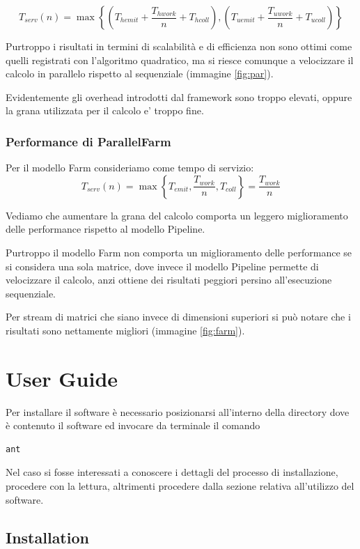 \documentclass[a4paper,10pt]{article}
\begin{document}
$$T_{serv}(n) = \max \left\lbrace \left( T_{hemit} + \frac{T_{hwork}}{n} + T_{hcoll}\right),\left( T_{uemit} + \frac{T_{uwork}}{n} + T_{ucoll}\right) \right\rbrace$$

Purtroppo i risultati in termini di scalabilit\`a e di efficienza non sono ottimi come quelli registrati con l'algoritmo quadratico, ma si riesce comunque a velocizzare il calcolo in parallelo rispetto al sequenziale (immagine \ref{fig:par}).

Evidentemente gli overhead introdotti dal framework sono troppo elevati, oppure la grana utilizzata per il calcolo e' troppo fine.


\subsubsection{Performance di \textsf{ParallelFarm}}

Per il modello \textsf{Farm} consideriamo come tempo di servizio: $$T_{serv}(n) = \max \left\lbrace T_{emit}, \frac{T_{work}}{n}, T_{coll} \right\rbrace = \frac{T_{work}}{n}$$

Vediamo che aumentare la grana del calcolo comporta un leggero miglioramento delle performance rispetto al modello \textsf{Pipeline}.

Purtroppo il modello \textsf{Farm} non comporta un miglioramento delle performance se si considera una sola matrice, dove invece il modello \textsf{Pipeline} permette di velocizzare il calcolo, anzi ottiene dei risultati peggiori persino all'esecuzione sequenziale.

Per stream di matrici che siano invece di dimensioni superiori si pu\`o notare che i risultati sono nettamente migliori (immagine \ref{fig:farm}).

\section{User Guide}
\label{sec:userguide}

Per installare il software \`e necessario posizionarsi all'interno della directory dove \`e contenuto il software ed invocare da terminale il comando
\begin{lstlisting}
ant
\end{lstlisting}

Nel caso si fosse interessati a conoscere i dettagli del processo di installazione, procedere con la lettura, altrimenti procedere dalla sezione relativa all'utilizzo del software.

\subsection{Installation}
\end{document}
